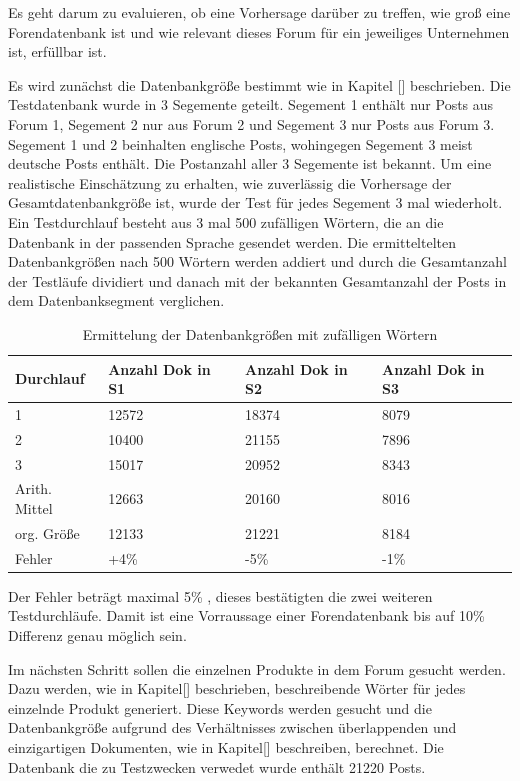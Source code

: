 Es geht darum zu evaluieren, ob eine Vorhersage darüber zu treffen, wie groß eine Forendatenbank ist und wie relevant dieses Forum für ein jeweiliges Unternehmen ist, erfüllbar ist.

Es wird zunächst die Datenbankgröße bestimmt wie in Kapitel [] beschrieben. Die Testdatenbank wurde in 3 Segemente geteilt. Segement 1 enthält nur Posts aus Forum 1, Segement 2 nur aus Forum 2 und Segement 3 nur Posts aus Forum 3. 
Segement 1 und 2 beinhalten englische Posts, wohingegen Segement 3 meist deutsche Posts enthält. Die Postanzahl aller 3 Segemente ist bekannt. Um eine realistische Einschätzung zu erhalten, wie zuverlässig die Vorhersage der Gesamtdatenbankgröße ist, wurde der Test für jedes Segement 3 mal wiederholt. Ein Testdurchlauf besteht aus 3 mal 500 zufälligen Wörtern, die an die Datenbank in der passenden Sprache gesendet werden. Die ermitteltelten Datenbankgrößen nach 500 Wörtern werden addiert und durch die Gesamtanzahl der Testläufe dividiert und danach mit der bekannten Gesamtanzahl der Posts in dem Datenbanksegment verglichen.

\begin{table}[h!]
\begin{tabular}{ | p{3cm} | p{3cm} | p{3cm}| p{3cm} |} \hline
Durchlauf & Anzahl Dok in S1 & Anzahl Dok in S2 & Anzahl Dok in S3 \\ \hline
1 & 12572  & 18374 & 8079 \\ \hline
2 & 10400 & 21155 & 7896 \\ \hline
3 & 15017 & 20952 & 8343  \\ \hline
Arith. Mittel & 12663 & 20160 & 8016 \\ \hline
org. Größe & 12133 & 21221 & 8184 \\ \hline
Fehler & +4\% & -5\% & -1\% \\ \hline
\end{tabular}
\caption{Ermittelung der Datenbankgrößen mit zufälligen Wörtern}
\end{table}

\newpage

Der Fehler beträgt maximal 5\% , dieses bestätigten die zwei weiteren Testdurchläufe. Damit ist eine Vorraussage einer Forendatenbank bis auf 10\% Differenz genau möglich sein.

Im nächsten Schritt sollen die einzelnen Produkte in dem Forum gesucht werden. Dazu werden, wie in Kapitel[] beschrieben, beschreibende Wörter für jedes einzelnde Produkt generiert. Diese Keywords werden gesucht und die Datenbankgröße aufgrund des Verhältnisses zwischen überlappenden und einzigartigen Dokumenten, wie in Kapitel[] beschreiben, berechnet. Die Datenbank die zu Testzwecken verwedet wurde enthält 21220 Posts.

